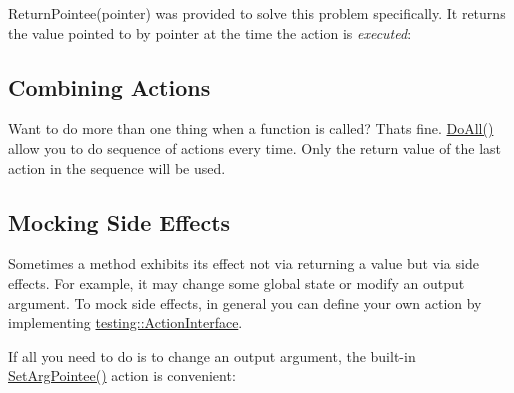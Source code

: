 {\ttfamily Return\+Pointee(pointer)} was provided to solve this problem specifically. It returns the value pointed to by {\ttfamily pointer} at the time the action is {\itshape executed}\+:


\begin{DoxyCode}{0}
\end{DoxyCode}


\subsection*{Combining Actions}

Want to do more than one thing when a function is called? That\textquotesingle{}s fine. {\ttfamily \mbox{\hyperlink{namespacetesting_a3824c79dc6e9e05c337a675e82da2045}{Do\+All()}}} allow you to do sequence of actions every time. Only the return value of the last action in the sequence will be used.


\begin{DoxyCode}{0}
\DoxyCodeLine{}
\DoxyCodeLine{\};}
\DoxyCodeLine{}
\end{DoxyCode}


\subsection*{Mocking Side Effects}

Sometimes a method exhibits its effect not via returning a value but via side effects. For example, it may change some global state or modify an output argument. To mock side effects, in general you can define your own action by implementing {\ttfamily \mbox{\hyperlink{classtesting_1_1_action_interface}{testing\+::\+Action\+Interface}}}.

If all you need to do is to change an output argument, the built-\/in {\ttfamily \mbox{\hyperlink{namespacetesting_a6dbe77dc170c495ea300dd9d74ed4595}{Set\+Arg\+Pointee()}}} action is convenient\+:


